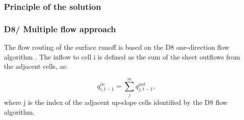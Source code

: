         \subsubsection{Principle of the solution}


        \subsubsection{D8/ Multiple flow approach}

            The flow routing of the surface runoff is based on the D8 one-direction flow
            algorithm \cite{o1984extraction}. The inflow to cell i is defined as the sum of the sheet
            outflows from the adjacent cells, as:

            \begin{equation} 
            q^{in}_{i,t-1} = \sum_j^m q^{out}_{j,t-1}, 
            \label{eq:d8}
            \end{equation} 
            where j is the index of the adjacent up-slope cells identified by the D8 flow
            algorithm.

 

